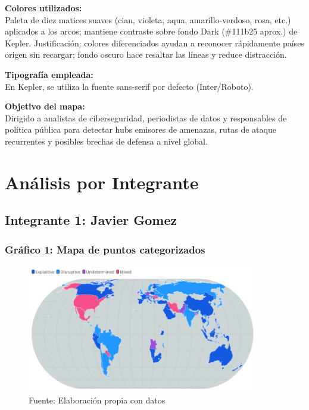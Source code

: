 \documentclass[12pt, a4paper]{article}
\begin{document}
\textbf{Colores utilizados:} \\
Paleta de diez matices suaves (cian, violeta, aqua, amarillo-verdoso, rosa, etc.) aplicados a los arcos; mantiene contraste sobre fondo Dark (\#111b25 aprox.) de Kepler.
Justificación: colores diferenciados ayudan a reconocer rápidamente países origen sin recargar; fondo oscuro hace resaltar las líneas y reduce distracción.

\textbf{Tipografía empleada:} \\
En Kepler, se utiliza la fuente sans-serif por defecto (Inter/Roboto).

\textbf{Objetivo del mapa:} \\
Dirigido a analistas de ciberseguridad, periodistas de datos y responsables de política pública para detectar hubs emisores de amenazas, rutas de ataque recurrentes y posibles brechas de defensa a nivel global.

\section*{Análisis por Integrante}

\subsection*{Integrante 1: Javier Gomez}


\subsubsection*{Gráfico 1: Mapa de puntos categorizados}
\begin{figure}[H]
    \centering
    \includegraphics[width=0.9\textwidth]{images/punto_cate.png}
    \caption{Fuente: Elaboración propia con datos}
\end{figure}
\end{document}
